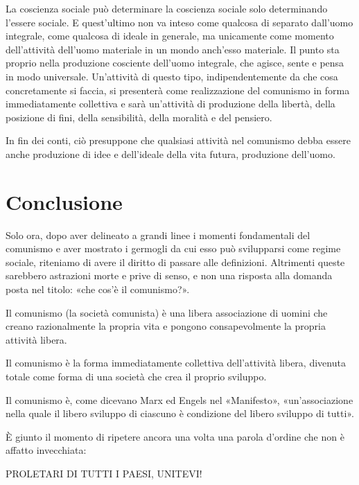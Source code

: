 \documentclass[12pt,a4paper,openany]{book}
\begin{document}
La coscienza sociale può determinare la coscienza sociale solo determinando l'essere sociale. E quest'ultimo non va inteso come qualcosa di separato dall'uomo integrale, come qualcosa di ideale in generale, ma unicamente come momento dell'attività dell'uomo materiale in un mondo anch'esso materiale. Il punto sta proprio nella produzione cosciente dell'uomo integrale, che agisce, sente e pensa in modo universale. Un'attività di questo tipo, indipendentemente da che cosa concretamente si faccia, si presenterà come realizzazione del comunismo in forma immediatamente collettiva e sarà un'attività di produzione della libertà, della posizione di fini, della sensibilità, della moralità e del pensiero.

In fin dei conti, ciò presuppone che qualsiasi attività nel comunismo debba essere anche produzione di idee e dell'ideale della vita futura, produzione dell'uomo.
\ifSubfilesClassLoaded{\setcounter{page}{62}}{}
\section{Conclusione}
\label{sec:11_conclusione}

Solo ora, dopo aver delineato a grandi linee i momenti fondamentali del comunismo e aver mostrato i germogli da cui esso può svilupparsi come regime sociale, riteniamo di avere il diritto di passare alle definizioni. Altrimenti queste sarebbero astrazioni morte e prive di senso, e non una risposta alla domanda posta nel titolo: «che cos'è il comunismo?».

Il comunismo (la società comunista) è una libera associazione di uomini che creano razionalmente la propria vita e pongono consapevolmente la propria attività libera.

Il comunismo è la forma immediatamente collettiva dell'attività libera, divenuta totale come forma di una società che crea il proprio sviluppo.

Il comunismo è, come dicevano Marx ed Engels nel «Manifesto», «un'associazione nella quale il libero sviluppo di ciascuno è condizione del libero sviluppo di tutti».

È giunto il momento di ripetere ancora una volta una parola d'ordine che non è affatto invecchiata:

PROLETARI DI TUTTI I PAESI, UNITEVI!
\end{document}
